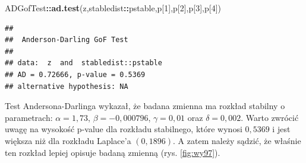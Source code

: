 \documentclass[polish,]{book}
\newenvironment{Shaded}{\begin{snugshade}}{\end{snugshade}}
\newcommand{\DecValTok}[1]{\textcolor[rgb]{0.00,0.00,0.81}{#1}}
\newcommand{\KeywordTok}[1]{\textcolor[rgb]{0.13,0.29,0.53}{\textbf{#1}}}
\newcommand{\NormalTok}[1]{#1}
\newcommand{\OperatorTok}[1]{\textcolor[rgb]{0.81,0.36,0.00}{\textbf{#1}}}
\begin{document}
\begin{Shaded}
\begin{Highlighting}[]
\NormalTok{ADGofTest}\OperatorTok{::}\KeywordTok{ad.test}\NormalTok{(z,stabledist}\OperatorTok{::}\NormalTok{pstable,p[}\DecValTok{1}\NormalTok{],p[}\DecValTok{2}\NormalTok{],p[}\DecValTok{3}\NormalTok{],p[}\DecValTok{4}\NormalTok{])}
\end{Highlighting}
\end{Shaded}

\begin{verbatim}
## 
##  Anderson-Darling GoF Test
## 
## data:  z  and  stabledist::pstable
## AD = 0.72666, p-value = 0.5369
## alternative hypothesis: NA
\end{verbatim}

Test Andersona-Darlinga wykazał, że badana zmienna ma rozkład stabilny o parametrach: \(\alpha = 1,73\), \(\beta = -0,000796\), \(\gamma = 0,01\) oraz \(\delta = 0,002\). Warto zwrócić
uwagę na wysokość p-value dla rozkładu stabilnego, które wynosi \(0,5369\) i jest większa
niż dla rozkładu Laplace'a \((0,1896)\). A zatem należy sądzić, że właśnie ten rozkład
lepiej opisuje badaną zmienną (rys. \ref{fig:wy97}).
\end{document}
